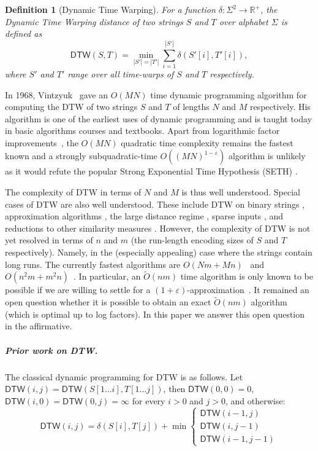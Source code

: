 \documentclass[10pt,a4paper]{article}
\newtheorem{definition}[theorem]{Definition}
\newcommand{\R}{\mathbb{R}}
\newcommand{\Rp}{\R^+}
\newcommand{\DTW}{\mathsf{DTW}}
\newcommand{\para}[1]{\vspace{-0.1in} \subparagraph*{#1}}
\begin{document}
\begin{definition}[Dynamic Time Warping]
	
For a function $\delta : \Sigma^2 \rightarrow \Rp$, 
 the Dynamic Time Warping distance of two strings $S$ 
and $T$ over alphabet $\Sigma$ is defined as 
$$
\DTW(S,T) =  \min_{|S'| = |T'|} \sum_{i = 1}^{|S'|} \delta(S'[i], T'[i]),
$$ where $S'$ and $T'$ range over all time-warps of $S$ and $T$ respectively. 
\end{definition}

In 1968, Vintzyuk~\cite{vintzyuk1968} gave an $O(MN)$ time dynamic programming algorithm for computing the DTW of two strings $S$ and $T$ of lengths $N$ and $M$ respectively. His algorithm is one of the earliest uses of dynamic programming and is  taught today in basic algorithms courses and textbooks. Apart from logarithmic factor improvements~\cite{DBLP:conf/icalp/GoldS17}, the $O(MN)$ quadratic time complexity remains the fastest known and a strongly subquadratic-time  $O((MN)^{1-\varepsilon})$ algorithm is unlikely as it would refute the popular Strong Exponential
Time Hypothesis (SETH) \cite{DTWhard2,DTWhard}. 

The complexity of DTW in terms of $N$ and $M$ is thus well understood. Special cases of DTW are also well understood. These include DTW on binary strings \cite{kuszmaul2021binary, schaar2020faster}, approximation algorithms \cite{DBLP:conf/icalp/Kuszmaul19, DTWapprox1, DTWapprox2}, the large distance regime \cite{DBLP:conf/icalp/Kuszmaul19}, sparse inputs \cite{sparseDTW1,sparseDTW2,sparseDTW3},  
and reductions to other similarity measures
\cite{DBLP:conf/icalp/Kuszmaul19,sakai2020reduction, sakai2020faster}.
However, the complexity of DTW is not yet resolved in terms of $n$ and $m$ (the run-length encoding sizes of $S$ and $T$ respectively). Namely, in the (especially appealing) case where the strings contain long runs. 
The currently fastest algorithms are $O(Nm+Mn)$~\cite{rle1,DBLP:journals/corr/abs-1903-03003,DBLP:conf/icalp/Kuszmaul19} and $O(n^2m +m^2n)$~\cite{DBLP:journals/corr/abs-1903-03003}. In particular, an  $\tilde O(nm)$ time algorithm is only known to be possible if we are willing to settle for a $(1+\varepsilon)$-approximation~\cite{DBLP:conf/esa/XiK22}. It remained an open question whether it is possible to obtain an exact $\tilde O(nm)$ algorithm (which is optimal up to log factors). In this paper we answer this open question in the affirmative.

\para{Prior work on DTW.}   

The classical dynamic programming for DTW is as follows. Let 
 $\DTW(i,j) = \DTW(S[1\ldots i], T[1\ldots j])$, then $\DTW(0,0) = 0$, $\DTW(i,0)=\DTW(0,j) = \infty$ for every $i>0$ and $j>0$, and otherwise:
\begin{equation}\label{eq:dtw}
\DTW(i,j)=   \delta(S[i],T[j]) + \min\begin{cases} 
\DTW(i-1,j)
\\
\DTW(i,j-1) 
\\
\DTW(i-1,j-1)
\end{cases}
\end{equation}
\end{document}
